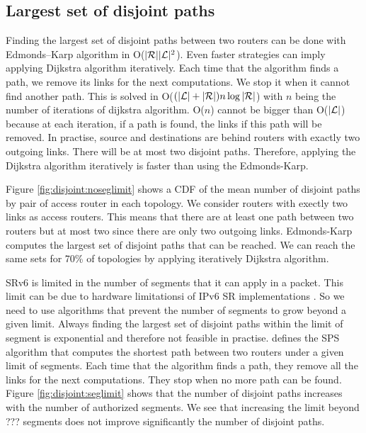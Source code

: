 \subsection{Largest set of disjoint paths}

Finding the largest set of disjoint paths between two routers can be done with Edmonds–Karp algorithm \cite{edmondskarp} in O($|\mathcal{R}||\mathcal{L}|^2$).
Even faster strategies can imply applying Dijkstra algorithm iteratively.
Each time that the algorithm finds a path, we remove its links for the next computations.
We stop it when it cannot find another path.
This is solved in O($(|\mathcal{L}|+|\mathcal{R}|)n\log{|\mathcal{R}|}$) with $n$ being the number of iterations of dijkstra algorithm.
O($n$) cannot be bigger than O($|\mathcal{L}|$) because at each iteration, if a path is found, the links if this path will be removed.
In practise, source and destinations are behind routers with exactly two outgoing links.
There will be at most two disjoint paths.
Therefore, applying the Dijkstra algorithm iteratively is faster than using the Edmonds-Karp.

Figure \ref{fig:disjoint:noseglimit} shows a CDF of the mean number of disjoint paths by pair of access router in each topology.
We consider routers with exectly two links as access routers.
This means that there are at least one path between two routers but at most two since there are only two outgoing links.
Edmonds-Karp computes the largest set of disjoint paths that can be reached.
We can reach the same sets for 70\% of topologies by applying iteratively Dijkstra algorithm.

SRv6 is limited in the number of segments that it can apply in a packet.
This limit can be due to hardware limitationsi of IPv6 SR implementations \cite{Tantsura_SID:2017}.
So we need to use algorithms that prevent the number of segments to grow beyond a given limit.
Always finding the largest set of disjoint paths within the limit of segment is exponential and therefore not feasible in practise.
\cite{aubry2015traffic} defines the SPS algorithm that computes the shortest path between two routers
under a given limit of segments.
Each time that the algorithm finds a path, they remove all the links for the next computations.
They stop when no more path can be found.
Figure \ref{fig:disjoint:seglimit} shows that the number of disjoint paths increases with the number of authorized segments.
We see that increasing the limit beyond ??? segments does not improve significantly the number of disjoint paths.

